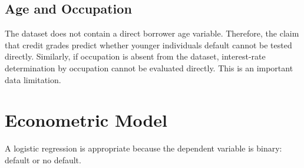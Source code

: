 \documentclass[11pt,preprint]{elsarticle}
\numberwithin{equation}{section}
\numberwithin{figure}{section}
\numberwithin{table}{section}
\begin{document}
\subsection{Age and Occupation}\label{age-and-occupation}

The dataset does not contain a direct borrower age variable. Therefore,
the claim that credit grades predict whether younger individuals default
cannot be tested directly. Similarly, if occupation is absent from the
dataset, interest-rate determination by occupation cannot be evaluated
directly. This is an important data limitation.

\section{Econometric Model}\label{econometric-model}

A logistic regression is appropriate because the dependent variable is
binary: default or no default.
\end{document}
